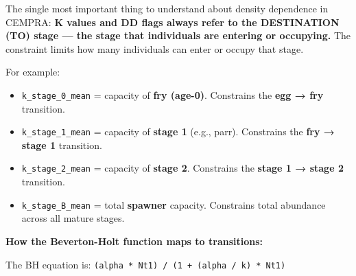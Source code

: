 \documentclass[
  letterpaper,
  DIV=11,
  numbers=noendperiod]{scrreprt}
\providecommand{\tightlist}{%
  \setlength{\itemsep}{0pt}\setlength{\parskip}{0pt}}
\begin{document}
\begin{tcolorbox}[enhanced jigsaw, colbacktitle=quarto-callout-important-color!10!white, title=\textcolor{quarto-callout-important-color}{\faExclamation}\hspace{0.5em}{K Values Refer to the Destination (TO) Stage}, colframe=quarto-callout-important-color-frame, bottomrule=.15mm, opacityback=0, breakable, bottomtitle=1mm, arc=.35mm, opacitybacktitle=0.6, titlerule=0mm, colback=white, rightrule=.15mm, left=2mm, leftrule=.75mm, toprule=.15mm, toptitle=1mm, coltitle=black]

The single most important thing to understand about density dependence
in CEMPRA: \textbf{K values and DD flags always refer to the DESTINATION
(TO) stage --- the stage that individuals are entering or occupying.}
The constraint limits how many individuals can enter or occupy that
stage.

For example:

\begin{itemize}
\tightlist
\item
  \texttt{k\_stage\_0\_mean} = capacity of \textbf{fry (age-0)}.
  Constrains the \textbf{egg → fry} transition.
\item
  \texttt{k\_stage\_1\_mean} = capacity of \textbf{stage 1} (e.g.,
  parr). Constrains the \textbf{fry → stage 1} transition.
\item
  \texttt{k\_stage\_2\_mean} = capacity of \textbf{stage 2}. Constrains
  the \textbf{stage 1 → stage 2} transition.
\item
  \texttt{k\_stage\_B\_mean} = total \textbf{spawner} capacity.
  Constrains total abundance across all mature stages.
\end{itemize}

\textbf{How the Beverton-Holt function maps to transitions:}

The BH equation is:
\texttt{(alpha\ *\ Nt1)\ /\ (1\ +\ (alpha\ /\ k)\ *\ Nt1)}


\end{tcolorbox}
\end{document}
